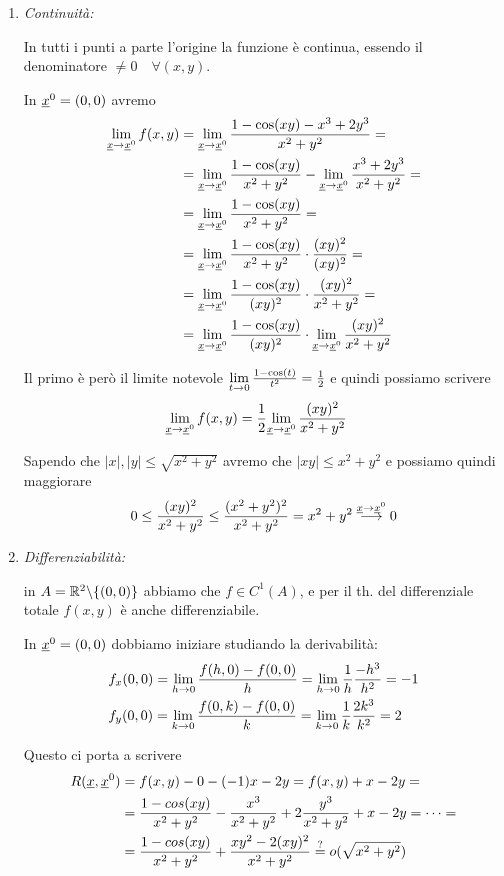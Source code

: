 \begin{enumerate}
	\item \textit{Continuità:}
	
	In tutti i punti a parte l'origine la funzione è continua, essendo il denominatore $ \neq 0 \quad \forall (x,y)$.
	
	In $\underline{x}^0=(0,0)$ avremo
	\begin{align}
		\underset{\underline{x} \rightarrow \underline{x}^0}{\lim} \, f(x,y) {}&= \underset{\underline{x} \rightarrow \underline{x}^0}{\lim} \, \frac{1 - \cos(xy) - x^3 + 2y^3}{x^2 + y^2} = \nonumber \\
		&= \underset{\underline{x} \rightarrow \underline{x}^0}{\lim} \, \frac{1 - \cos(xy)}{x^2 + y^2} -  \underset{\underline{x} \rightarrow \underline{x}^0}{\lim} \, \frac{x^3 +2y^3}{x^2 + y^2} = \nonumber \\
		&= \underset{\underline{x} \rightarrow \underline{x}^0}{\lim} \, \frac{1 - \cos(xy)}{x^2 + y^2}= \nonumber \\
		&= \underset{\underline{x} \rightarrow \underline{x}^0}{\lim} \, \frac{1 - \cos(xy)}{x^2 + y^2} \cdot \frac{(xy)^2}{(xy)^2} = \nonumber \\
		&= \underset{\underline{x} \rightarrow \underline{x}^0}{\lim} \, \frac{1 - \cos(xy)}{(xy)^2} \cdot \frac{(xy)^2}{x^2 + y^2} = \nonumber \\
		&= \underset{\underline{x} \rightarrow \underline{x}^0}{\lim} \, \frac{1 - \cos(xy)}{(xy)^2} \cdot \underset{\underline{x} \rightarrow \underline{x}^0}{\lim} \,\frac{(xy)^2}{x^2 + y^2}
	\end{align}
	
	Il primo è però il limite notevole $\underset{t \rightarrow 0}{\lim} \, \frac{1 - \cos(t)}{t^2}=\frac{1}{2}$ e quindi possiamo scrivere
	\begin{align}
		\underset{\underline{x} \rightarrow \underline{x}^0}{\lim} \, f(x,y) {}&= \frac{1}{2} \underset{\underline{x} \rightarrow \underline{x}^0}{\lim} \,  \frac{(xy)^2}{x^2 + y^2}
	\end{align}
	
	Sapendo che $|x|,|y| \leq \sqrt{x^2 + y^2}$ avremo che $|xy| \leq x^2 + y^2$ e possiamo quindi maggiorare
	\begin{align}
		0\leq \frac{(xy)^2}{x^2 + y^2} \leq \frac{(x^2 + y^2)^2}{x^2 + y^2}= x^2 + y^2 \overset{\underline{x} \rightarrow \underline{x}^0}{\longrightarrow}0
	\end{align}
	
	\item \textit{Differenziabilità:}
	
	in $A=\mathbb{R}^2\backslash \{ (0,0) \}$ abbiamo che $f\in C^1(A)$, e per il th. del differenziale totale $f(x,y)$ è anche differenziabile.
	
	In $\underline{x}^0=(0,0)$ dobbiamo iniziare studiando la derivabilità:
	\begin{align}
		{}&f_x(0,0)= \underset{h \rightarrow 0}{\lim} \, \frac{f(h,0) - f(0,0)}{h} = \underset{h \rightarrow 0}{\lim} \, \frac{1}{h}\frac{-h^3}{h^2}=-1\\
		&f_y(0,0)= \underset{k \rightarrow 0}{\lim} \, \frac{f(0,k) - f(0,0)}{k} = \underset{k \rightarrow 0}{\lim} \, \frac{1}{k} \frac{2k^3}{k^2}=2
	\end{align}
	
	Questo ci porta a scrivere
	\begin{align}
		R(\underline{x},\underline{x}^0) {}&= f(x,y) - 0 - (-1)x - 2 y= f(x,y) +x - 2y= \nonumber \\
		&= \frac{1 - cos(xy)}{x^2 + y^2} - \frac{x^3}{x^2 + y^2} + 2 \frac{y^3}{x^2 + y^2} +x - 2y = \dots = \nonumber \\
		&= \frac{1 - cos(xy)}{x^2 + y^2} + \frac{xy^2 - 2(xy)^2}{x^2 + y^2} \overset{?}{=} o(\sqrt{x^2 + y^2})
	\end{align}
	

\end{enumerate}
